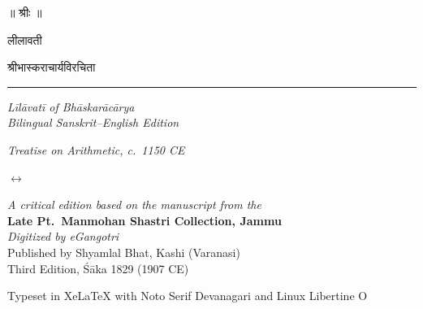 \documentclass[11pt,a4paper]{article}
\begin{document}
\begin{titlepage}
\centering
\vspace*{1cm}

{\Huge\devanagarifont\textcolor{titlecolor}{॥ श्रीः ॥}}

\vspace{1cm}

{\fontsize{32}{40}\selectfont\devanagarifont\textcolor{titlecolor}{लीलावती}}

\vspace{0.5cm}

{\LARGE\devanagarifont\textcolor{sectioncolor}{श्रीभास्कराचार्यविरचिता}}

\vspace{0.8cm}
\rule{0.6\textwidth}{0.6pt}
\vspace{0.8cm}

{\Large\textit{Līlāvatī of Bhāskarācārya}}\\[0.3em]
{\normalsize\textit{Bilingual Sanskrit–English Edition}}

\vspace{0.3cm}

{\small\textit{Treatise on Arithmetic, c.\ 1150 CE}}

\vspace{1.2cm}

\hspace{0.5cm}
{\Large $\longleftrightarrow$}
\hspace{0.5cm}

\vspace{1.5cm}

\begin{minipage}{0.8\textwidth}
\centering
\textit{A critical edition based on the manuscript from the}\\
\textbf{Late Pt.\ Manmohan Shastri Collection, Jammu}\\
\textit{Digitized by eGangotri}\\[0.5em]
Published by Shyamlal Bhat, Kashi (Varanasi)\\
Third Edition, Śāka 1829 (1907 CE)
\end{minipage}

\vfill

{\footnotesize Typeset in XeLaTeX with Noto Serif Devanagari and Linux Libertine O}

\end{titlepage}
\end{document}
